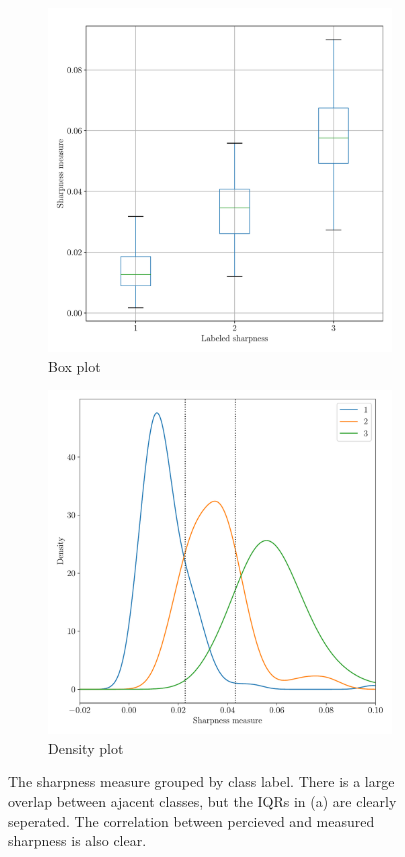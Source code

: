 \begin{figure}[htbp]
  \centering
  \begin{subfigure}[t]{0.49\textwidth}
    \centering
    \includegraphics[width=\textwidth]{figs/box.pdf}
    \caption{Box plot}\label{fig:sharpness-box}
\end{subfigure}%
\hfill
\begin{subfigure}[t]{0.48\textwidth}
  \centering
  \includegraphics[width=\textwidth]{figs/qden.pdf}
  \caption{Density plot}\label{fig:sharpness-qden}
\end{subfigure}
  \caption[Sharpness measure seperability]{The sharpness measure grouped by class label. There is a large overlap between ajacent classes, but the IQRs in (a) are clearly seperated. The correlation between percieved and measured sharpness is also clear.}\label{fig:sharpness}
\end{figure}

